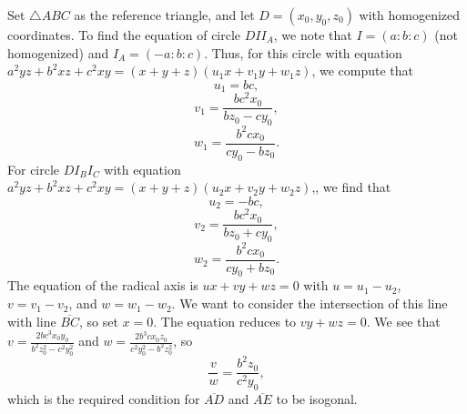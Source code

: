 \begin{enumerate}
Set $\triangle ABC$ as the reference triangle, and let $D=(x_0,y_0,z_0)$ with homogenized coordinates. To find the equation of circle $DII_A$, we note that $I=(a:b:c)$ (not homogenized) and $I_A=(-a:b:c)$. Thus, for this circle with equation $a^2yz+b^2xz+c^2xy=(x+y+z)(u_1x+v_1y+w_1z)$, we compute that 
 \[u_1=bc,\] 
 \[v_1=\frac{bc^2x_0}{bz_0-cy_0},\] 
 \[w_1=\frac{b^2cx_0}{cy_0-bz_0}.\]For circle $DI_BI_C$ with equation $a^2yz+b^2xz+c^2xy=(x+y+z)(u_2x+v_2y+w_2z)$,, we find that 
 \[u_2=-bc,\] 
 \[v_2=\frac{bc^2x_0}{bz_0+cy_0},\] 
 \[w_2=\frac{b^2cx_0}{cy_0+bz_0}.\]The equation of the radical axis is $ux+vy+wz=0$ with $u=u_1-u_2$, $v=v_1-v_2$, and $w=w_1-w_2$. We want to consider the intersection of this line with line $\overline{BC}$, so set $x=0$. The equation reduces to $vy+wz=0$. We see that $v=\frac{2bc^3x_0y_0}{b^2z_0^2-c^2y_0^2}$ and $w=\frac{2b^3cx_0z_0}{c^2y_0^2-b^2z_0^2}$, so 
 \[\frac{v}{w}=\frac{b^2z_0}{c^2y_0},\] which is the required condition for $\overline{AD}$ and $\overline{AE}$ to be isogonal.

 


\end{enumerate}